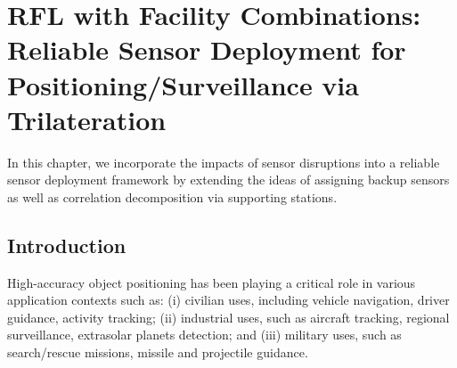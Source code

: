 
\chapter{RFL with Facility Combinations: Reliable Sensor Deployment for Positioning/Surveillance via Trilateration}\label{chap:sensor}

In this chapter, we incorporate the impacts of sensor disruptions into a reliable sensor deployment framework by extending the ideas of assigning backup sensors as well as correlation decomposition via supporting stations. 


\section{Introduction}\label{sensor:intro}

High-accuracy object positioning has been playing a critical role in various application contexts such as: (i) civilian uses, including vehicle navigation, driver guidance, activity tracking; (ii) industrial uses, such as aircraft tracking, regional surveillance, extrasolar planets detection; and (iii) military uses, such as search/rescue missions, missile and projectile guidance.


